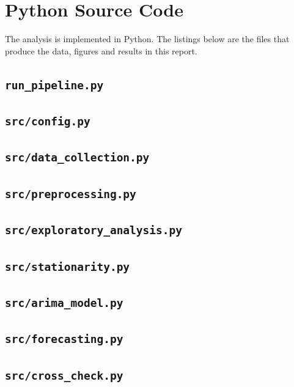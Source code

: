 \documentclass[11pt,a4paper]{article}
\begin{document}
\clearpage
\section{Python Source Code}

The analysis is implemented in Python. The listings below are the files that produce the data, figures and results in this report.

\subsection{\texttt{run\_pipeline.py}}


\subsection{\texttt{src/config.py}}


\subsection{\texttt{src/data\_collection.py}}


\subsection{\texttt{src/preprocessing.py}}


\subsection{\texttt{src/exploratory\_analysis.py}}


\subsection{\texttt{src/stationarity.py}}


\subsection{\texttt{src/arima\_model.py}}


\subsection{\texttt{src/forecasting.py}}


\subsection{\texttt{src/cross\_check.py}}

\end{document}
